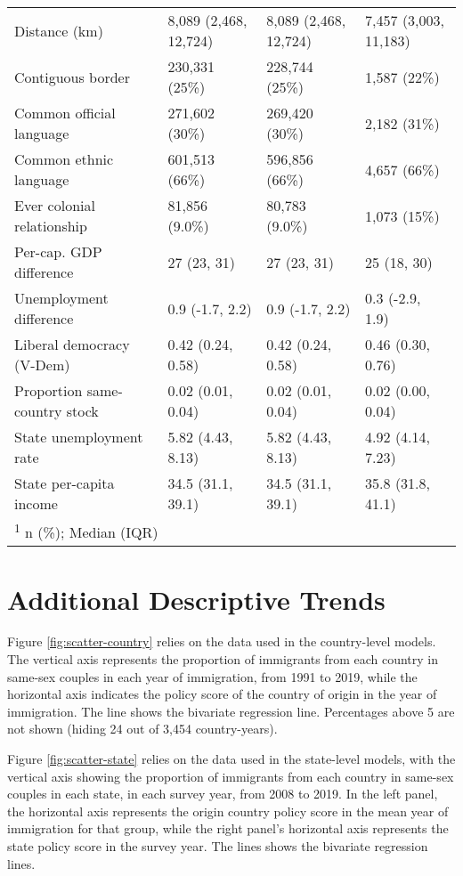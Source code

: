 \documentclass[
  11pt,
]{article}
\begin{document}
\begin{table}[!h]
\begin{tabular}[t]{llll}
Distance (km) & 8,089 (2,468, 12,724) & 8,089 (2,468, 12,724) & 7,457 (3,003, 11,183)\\
Contiguous border & 230,331 (25\%) & 228,744 (25\%) & 1,587 (22\%)\\
\addlinespace
Common official language & 271,602 (30\%) & 269,420 (30\%) & 2,182 (31\%)\\
Common ethnic language & 601,513 (66\%) & 596,856 (66\%) & 4,657 (66\%)\\
Ever colonial relationship & 81,856 (9.0\%) & 80,783 (9.0\%) & 1,073 (15\%)\\
Per-cap. GDP difference & 27 (23, 31) & 27 (23, 31) & 25 (18, 30)\\
Unemployment difference & 0.9 (-1.7, 2.2) & 0.9 (-1.7, 2.2) & 0.3 (-2.9, 1.9)\\
\addlinespace
Liberal democracy (V-Dem) & 0.42 (0.24, 0.58) & 0.42 (0.24, 0.58) & 0.46 (0.30, 0.76)\\
Proportion same-country stock & 0.02 (0.01, 0.04) & 0.02 (0.01, 0.04) & 0.02 (0.00, 0.04)\\
State unemployment rate & 5.82 (4.43, 8.13) & 5.82 (4.43, 8.13) & 4.92 (4.14, 7.23)\\
State per-capita income & 34.5 (31.1, 39.1) & 34.5 (31.1, 39.1) & 35.8 (31.8, 41.1)\\
\bottomrule
\multicolumn{4}{l}{\rule{0pt}{1em}\textsuperscript{1} n (\%); Median (IQR)}\\
\end{tabular}
\end{table}

\newpage

\hypertarget{additional-descriptive-trends}{%
\section{Additional Descriptive Trends}\label{additional-descriptive-trends}}

Figure \ref{fig:scatter-country} relies on the data used in the country-level models. The vertical axis represents the proportion of immigrants from each country in same-sex couples in each year of immigration, from 1991 to 2019, while the horizontal axis indicates the policy score of the country of origin in the year of immigration. The line shows the bivariate regression line. Percentages above 5 are not shown (hiding 24 out of 3,454 country-years).

Figure \ref{fig:scatter-state} relies on the data used in the state-level models, with the vertical axis showing the proportion of immigrants from each country in same-sex couples in each state, in each survey year, from 2008 to 2019. In the left panel, the horizontal axis represents the origin country policy score in the mean year of immigration for that group, while the right panel's horizontal axis represents the state policy score in the survey year. The lines shows the bivariate regression lines.
\end{document}
